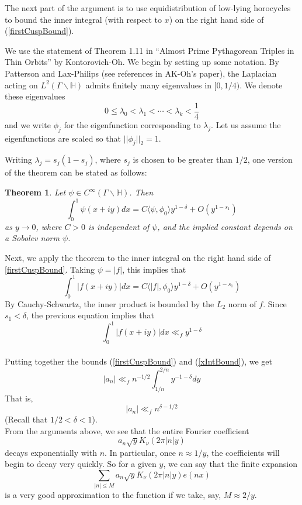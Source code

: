 \documentclass[]{article}
\newtheorem*{theorem}{Theorem}
\begin{document}
The next part of the argument is to use equidistribution of low-lying horocycles to bound the inner integral (with respect to $x$) on the right hand side of (\ref{firstCuspBound}).

We use the statement of Theorem 1.11 in ``Almost Prime Pythagorean Triples in Thin Orbits'' by Kontorovich-Oh.
We begin by setting up some notation.
By Patterson and Lax-Philips (see references in AK-Oh's paper), the Laplacian acting on $L^2(\Gamma\backslash\mathbb{H})$ admits finitely many eigenvalues in $[0, 1/4)$.
We denote these eigenvalues
$$
0 \leq \lambda_0 < \lambda_1 < \cdots < \lambda_k < \frac{1}{4}
$$
and we write $\phi_j$ for the eigenfunction corresponding to $\lambda_j$.
Let us assume the eigenfunctions are scaled so that $||\phi_j||_2 = 1$.

Writing $\lambda_j = s_j(1 - s_j)$, where $s_j$ is chosen to be greater than $1/2$, one version of the theorem can be stated as follows:
\begin{theorem}
	Let $\psi \in C^\infty(\Gamma\backslash\mathbb{H})$. Then
	$$
	\int_{0}^{1}\psi(x + iy)dx =
	C\langle \psi, \phi_0 \rangle y^{1-\delta} + O\left( y^{1 - s_1} \right)
	$$
	as $y \rightarrow 0$, where $C > 0$ is independent of $\psi$, and the implied constant depends on a Sobolev norm $\psi$.
\end{theorem}

Next, we apply the theorem to the inner integral on the right hand side of \ref{firstCuspBound}.
Taking $\psi = |f|$, this implies that
$$
\int_{0}^{1}|f(x + iy)|dx =
C\langle |f|, \phi_0 \rangle y^{1-\delta} + O\left( y^{1 - s_1} \right)
$$
By Cauchy-Schwartz, the inner product is bounded by the $L_2$ norm of $f$.
Since $s_1 < \delta$, the previous equation implies that
\begin{equation}\label{xIntBound}
	\int_{0}^{1}|f(x + iy)|dx \ll_f y^{1 - \delta}
\end{equation}
\\

Putting together the bounds (\ref{firstCuspBound}) and (\ref{xIntBound}), we get
$$
|a_n| \ll_f n^{-1/2}\int_{1/n}^{2/n}y^{-1-\delta}dy
$$
That is,
\begin{equation}\label{cuspBound}
	|a_n| \ll_f n^{\delta-1/2}
\end{equation}
(Recall that $1/2 < \delta < 1$).
\\

From the arguments above, we see that the entire Fourier coefficient
$$
a_n\sqrt{y}K_\nu(2\pi|n|y)
$$
decays exponentially with $n$.
In particular, once $n \approx 1/y$, the coefficients will begin to decay very quickly.
So for a given $y$, we can say that the finite expansion
$$
\sum_{|n| \leq M}a_n\sqrt{y}K_\nu(2\pi|n|y)e(nx)
$$
is a very good approximation to the function if we take, say, $M \approx 2/y$.
\end{document}
